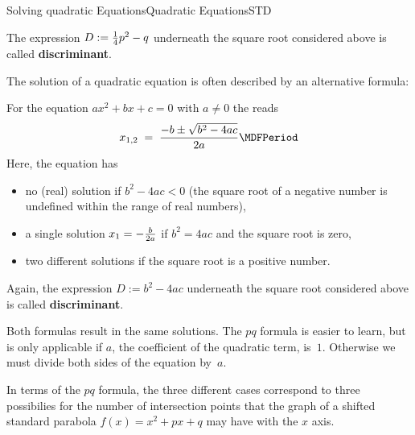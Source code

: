 \begin{MXContent}{Solving quadratic Equations}{Quadratic Equations}{STD}
\begin{MInfo}
The expression $D:=\tfrac{1}{4}p^2-q$ underneath the square root considered above is called 
\textbf{discriminant}.
\end{MInfo}
The solution of a quadratic equation is often described by an alternative formula:
\begin{MInfo}
For the equation $a x^2+b x + c = 0$ with $a\ne 0$ the
 reads
$$
x_{1,2} \;=\; \frac{-b\pm\sqrt{b^2-4 a c}}{2a} \MDFPeriod
$$
Here, the equation has
\begin{itemize}
\item{no (real) solution if $b^2-4 a c<0$ (the square root of a negative number is undefined within the
range of real numbers),}
\item{a single solution $x_1=-\tfrac{b}{2a}$ if $b^2=4 a c$ and the square root is zero,}
\item{two different solutions if the square root is a positive number.}
\end{itemize}
Again, the expression $D:=b^2-4 a c$ underneath the square root considered above is called 
\textbf{discriminant}.
\end{MInfo}
Both formulas result in the same solutions. The $pq$ formula is easier to learn, but is
only applicable if $a$, the coefficient of the quadratic term, is~$1$. Otherwise we must
divide both sides of the equation by~$a$.
\medskip\par
In terms of the $pq$ formula, the three different cases correspond to three possibilies for the number of intersection points that the graph of a shifted standard parabola
$f(x)=x^2+p x+ q$ may have with the $x$ axis.

\begin{center}
\end{center}


\end{MXContent}
